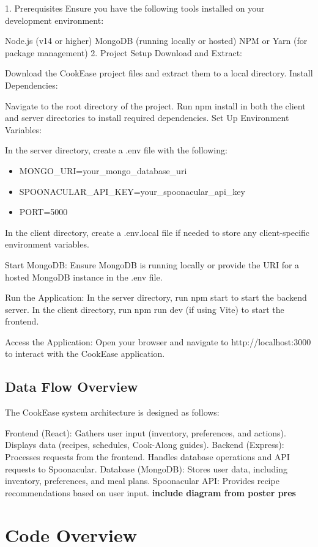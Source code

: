 \documentclass[10pt,twocolumn]{article}
\begin{document}
1. Prerequisites
Ensure you have the following tools installed on your development environment:

Node.js (v14 or higher)
MongoDB (running locally or hosted)
NPM or Yarn (for package management)
2. Project Setup
Download and Extract:

Download the CookEase project files and extract them to a local directory.
Install Dependencies:

Navigate to the root directory of the project.
Run npm install in both the client and server directories to install required dependencies.
Set Up Environment Variables:

In the server directory, create a .env file with the following:
\begin{itemize}
    \item MONGO\_URI=your\_mongo\_database\_uri
    \item SPOONACULAR\_API\_KEY=your\_spoonacular\_api\_key
    \item PORT=5000
\end{itemize}

In the client directory, create a .env.local file if needed to store any client-specific environment variables.

Start MongoDB:
Ensure MongoDB is running locally or provide the URI for a hosted MongoDB instance in the .env file.

Run the Application:
In the server directory, run npm start to start the backend server.
In the client directory, run npm run dev (if using Vite) to start the frontend.

Access the Application:
Open your browser and navigate to http://localhost:3000 to interact with the CookEase application.
\subsection{Data Flow Overview}
The CookEase system architecture is designed as follows:

Frontend (React):
Gathers user input (inventory, preferences, and actions).
Displays data (recipes, schedules, Cook-Along guides).
Backend (Express):
Processes requests from the frontend.
Handles database operations and API requests to Spoonacular.
Database (MongoDB):
Stores user data, including inventory, preferences, and meal plans.
Spoonacular API:
Provides recipe recommendations based on user input.
\textbf{include diagram from poster pres}

\section{Code Overview}
\end{document}
